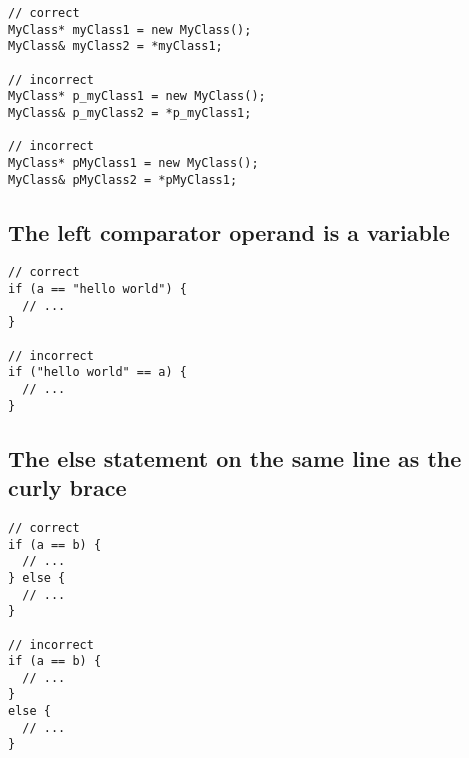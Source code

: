 \begin{verbatim}
// correct
MyClass* myClass1 = new MyClass();
MyClass& myClass2 = *myClass1;

// incorrect
MyClass* p_myClass1 = new MyClass();
MyClass& p_myClass2 = *p_myClass1;

// incorrect
MyClass* pMyClass1 = new MyClass();
MyClass& pMyClass2 = *pMyClass1;
\end{verbatim}

\subsection{The left comparator operand is a variable}

\begin{verbatim}
// correct
if (a == "hello world") {
  // ...
}

// incorrect
if ("hello world" == a) {
  // ...
}
\end{verbatim}

\subsection{The else statement on the same line as the curly brace}

\begin{verbatim}
// correct
if (a == b) {
  // ...
} else {
  // ...
}

// incorrect
if (a == b) {
  // ...
}
else {
  // ...
}
\end{verbatim}

